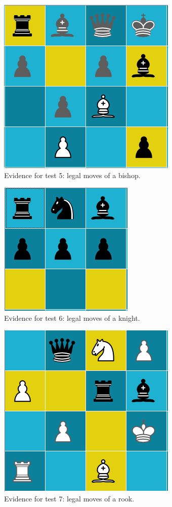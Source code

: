 \begin{figure}[H]
	\centering
	\includegraphics{images/screenshots/test-5}
	\caption{Evidence for test 5: legal moves of a bishop.}
	\label{test-5}
\end{figure}
\begin{figure}[H]
	\centering
	\includegraphics{images/screenshots/test-6}
	\caption{Evidence for test 6: legal moves of a knight.}
	\label{test-6}
\end{figure}
\begin{figure}[H]
	\centering
	\includegraphics{images/screenshots/test-7}
	\caption{Evidence for test 7: legal moves of a rook.}
	\label{test-7}
\end{figure}
